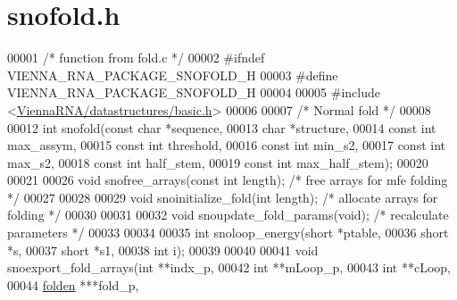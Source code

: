 \hypertarget{snofold_8h_source}{}\section{snofold.\+h}
\label{snofold_8h_source}

\begin{DoxyCode}
00001 \textcolor{comment}{/* function from fold.c */}
00002 \textcolor{preprocessor}{#ifndef VIENNA\_RNA\_PACKAGE\_SNOFOLD\_H}
00003 \textcolor{preprocessor}{#define VIENNA\_RNA\_PACKAGE\_SNOFOLD\_H}
00004 
00005 \textcolor{preprocessor}{#include <\hyperlink{datastructures_2basic_8h}{ViennaRNA/datastructures/basic.h}>}
00006 
00007 \textcolor{comment}{/* Normal fold */}
00008 
00012 \textcolor{keywordtype}{int}  snofold(\textcolor{keyword}{const} \textcolor{keywordtype}{char} *sequence,
00013              \textcolor{keywordtype}{char}       *structure,
00014              \textcolor{keyword}{const} \textcolor{keywordtype}{int}  max\_assym,
00015              \textcolor{keyword}{const} \textcolor{keywordtype}{int}  threshold,
00016              \textcolor{keyword}{const} \textcolor{keywordtype}{int}  min\_s2,
00017              \textcolor{keyword}{const} \textcolor{keywordtype}{int}  max\_s2,
00018              \textcolor{keyword}{const} \textcolor{keywordtype}{int}  half\_stem,
00019              \textcolor{keyword}{const} \textcolor{keywordtype}{int}  max\_half\_stem);
00020 
00021 
00026 \textcolor{keywordtype}{void}   snofree\_arrays(\textcolor{keyword}{const} \textcolor{keywordtype}{int} length);  \textcolor{comment}{/* free arrays for mfe folding */}
00027 
00028 
00029 \textcolor{keywordtype}{void}   snoinitialize\_fold(\textcolor{keywordtype}{int} length);    \textcolor{comment}{/* allocate arrays for folding */}
00030 
00031 
00032 \textcolor{keywordtype}{void}   snoupdate\_fold\_params(\textcolor{keywordtype}{void});       \textcolor{comment}{/* recalculate parameters */}
00033 
00034 
00035 \textcolor{keywordtype}{int}    snoloop\_energy(\textcolor{keywordtype}{short} *ptable,
00036                       \textcolor{keywordtype}{short} *s,
00037                       \textcolor{keywordtype}{short} *s1,
00038                       \textcolor{keywordtype}{int}   i);
00039 
00040 
00041 \textcolor{keywordtype}{void}   snoexport\_fold\_arrays(\textcolor{keywordtype}{int}    **indx\_p,
00042                              \textcolor{keywordtype}{int}    **mLoop\_p,
00043                              \textcolor{keywordtype}{int}    **cLoop,
00044                              \hyperlink{group__data__structures_structnode}{folden} ***fold\_p,

\end{DoxyCode}
